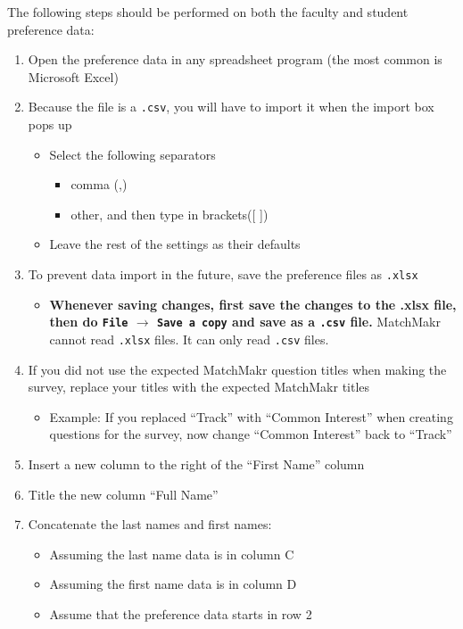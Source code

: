 The following steps should be performed on both the faculty and student preference data:
\begin{enumerate}
	\item Open the preference data in any spreadsheet program (the most common is Microsoft Excel)
	\item Because the file is a \texttt{.csv}, you will have to import it when the import box pops up
		\begin{itemize}
			\item Select the following separators
				\begin{itemize}
					\item comma (,)
					\item other, and then type in brackets([ ])
				\end{itemize}
			\item Leave the rest of the settings as their defaults
		\end{itemize}
	\item To prevent data import in the future, save the preference files as \texttt{.xlsx}
		\begin{itemize}
			\item \textbf{ Whenever saving changes, first save the changes to the .xlsx file, then do \texttt{File} $\rightarrow$ \texttt{Save a copy} and save as a \texttt{.csv} file.}  MatchMakr cannot read \texttt{.xlsx} files.  It can only read \texttt{.csv} files.
		\end{itemize}
	\item If you did not use the expected MatchMakr question titles when making the survey, replace your titles with the expected MatchMakr titles
		\begin{itemize}
			\item Example: If you replaced ``Track'' with ``Common Interest'' when creating questions for the survey, now change ``Common Interest'' back to ``Track''
		\end{itemize}
	\item Insert a new column to the right of the ``First Name'' column
	\item Title the new column ``Full Name''
	\item Concatenate the last names and first names:
		\begin{itemize}
			\item Assuming the last name data is in column C
			\item Assuming the first name data is in column D
			\item Assume that the preference data starts in row 2

\end{itemize}
\end{enumerate}
